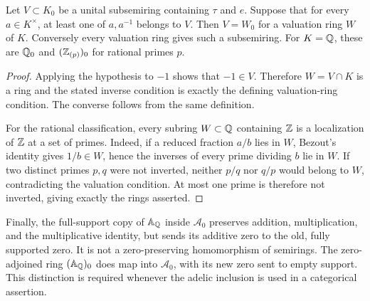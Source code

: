 \begin{proposition}\label{prop:valuations}
Let $V\subset K_0$ be a unital subsemiring containing $\tau$ and $e$. Suppose that for every $a\in K^\times$, at least one of $a,a^{-1}$ belongs to $V$. Then $V=W_0$ for a valuation ring $W$ of $K$. Conversely every valuation ring gives such a subsemiring. For $K=\mathbb Q$, these are $\mathbb Q_0$ and $(\mathbb Z_{(p)})_0$ for rational primes $p$.
\end{proposition}
\begin{proof}
Applying the hypothesis to $-1$ shows that $-1\in V$. Therefore $W=V\cap K$ is a ring and the stated inverse condition is exactly the defining valuation-ring condition. The converse follows from the same definition.

For the rational classification, every subring $W\subset\mathbb Q$ containing $\mathbb Z$ is a localization of $\mathbb Z$ at a set of primes. Indeed, if a reduced fraction $a/b$ lies in $W$, Bezout's identity gives $1/b\in W$, hence the inverses of every prime dividing $b$ lie in $W$. If two distinct primes $p,q$ were not inverted, neither $p/q$ nor $q/p$ would belong to $W$, contradicting the valuation condition. At most one prime is therefore not inverted, giving exactly the rings asserted.
\end{proof}

Finally, the full-support copy of $\mathbb A_\mathbb Q$ inside $\mathcal A_0$ preserves addition, multiplication, and the multiplicative identity, but sends its additive zero to the old, fully supported zero. It is not a zero-preserving homomorphism of semirings. The zero-adjoined ring $(\mathbb A_\mathbb Q)_0$ does map into $\mathcal A_0$, with its new zero sent to empty support. This distinction is required whenever the adelic inclusion is used in a categorical assertion.
